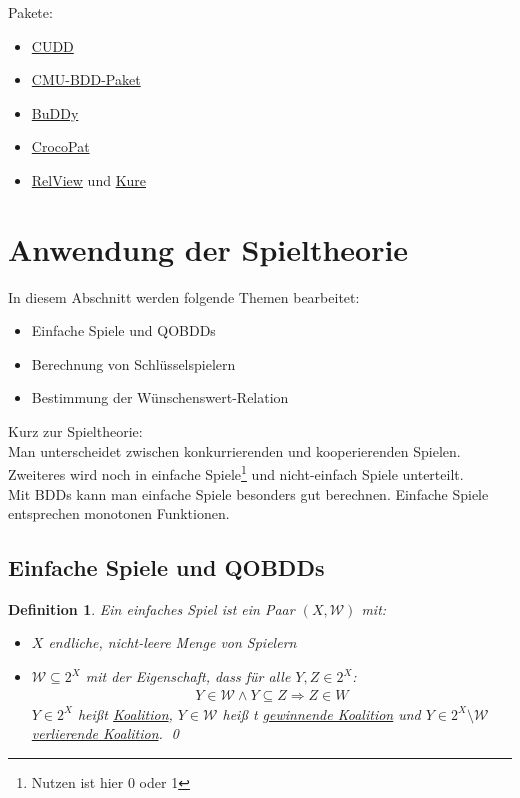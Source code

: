 \documentclass[ngerman]{scrartcl}
\theoremstyle{custom}
\newtheorem{mdef}{Definition} \numberwithin{mdef}{subsection}
\newcommand{\0}{\mathbf{0}}
\newcommand{\1}{\mathbf{L}}
\begin{document}
Pakete:
\begin{itemize}
\item[(1)] \href{http://vlsi.colorado.edu/~fabio/CUDD/}{CUDD}
\item[(2)] \href{http://www.cs.cmu.edu/~modelcheck/bdd.html}{CMU-BDD-Paket}
\item[(3)] \href{http://buddy.sourceforge.net/manual/main.html}{BuDDy}
\item[(4)] \href{http://www.sosy-lab.org/~dbeyer/CrocoPat/}{CrocoPat}
\item[(5)] \href{http://www.informatik.uni-kiel.de/~progsys/relview/}{RelView} und \href{http://korsika.informatik.uni-kiel.de/kure2/}{Kure}
\end{itemize}


\newpage

\section{Anwendung der Spieltheorie}
In diesem Abschnitt werden folgende Themen bearbeitet:
\begin{itemize}
\item Einfache Spiele und QOBDDs
\item Berechnung von Schl\"usselspielern
\item Bestimmung der W\"unschenswert-Relation
\end{itemize}

Kurz zur Spieltheorie:\\
Man unterscheidet zwischen konkurrierenden und kooperierenden
Spielen. Zweiteres wird noch in einfache Spiele\footnote{Nutzen ist
  hier 0 oder 1} und nicht-einfach Spiele unterteilt.\\
Mit BDDs kann man einfache Spiele besonders gut berechnen. Einfache
Spiele entsprechen monotonen Funktionen.

\subsection{Einfache Spiele und QOBDDs}
\begin{mdef}
Ein einfaches Spiel ist ein Paar $(X,\mathcal{W})$ mit:
\begin{itemize}
\item[(1)] $X$ endliche, nicht-leere Menge von Spielern
\item[(2)] $\mathcal{W} \subseteq 2^X$ mit der Eigenschaft, dass f\"ur
  alle $Y,Z \in 2^X$:
\begin{align*}
Y \in \mathcal{W} \wedge Y \subseteq Z \Rightarrow Z \in W
\end{align*}
$Y \in 2^X$ hei\ss t \underline{Koalition}, $Y \in \mathcal{W}$ hei\ss
t \underline{gewinnende Koalition} und $Y \in 2^{X} \setminus
  \mathcal{W}$ \underline{verlierende Koalition}.
\qed
\end{itemize}
\end{mdef}
\end{document}
